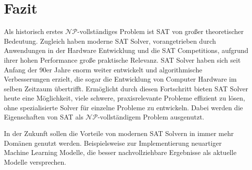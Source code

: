 \documentclass[conference,compsoc,final,a4paper]{IEEEtran}
\begin{document}
\section{Fazit}
Als historisch erstes $\mathcal{NP}$-vollständiges Problem ist SAT von großer theoretischer Bedeutung. Zugleich haben moderne SAT Solver, vorangetrieben durch Anwendungen in der Hardware Entwicklung und die SAT Competitions, aufgrund ihrer hohen Performance große praktische Relevanz. SAT Solver haben sich seit Anfang der 90er Jahre enorm weiter entwickelt und algorithmische Verbesserungen erzielt, die sogar die Entwicklung von Computer Hardware im selben Zeitzaum übertrifft. Ermöglicht durch diesen Fortschritt bieten SAT Solver heute eine Möglichkeit, viele schwere, praxisrelevante Probleme effizient zu lösen, ohne spezialisierte Solver für einzelne Probleme zu entwickeln. Dabei werden die Eigenschaften von SAT als $\mathcal{NP}$-vollständigem Problem ausgenutzt.

In der Zukunft sollen die Vorteile von modernen SAT Solvern in immer mehr Domänen genutzt werden. Beispielsweise zur Implementierung neuartiger Machine Learning Modelle, die besser nachvollziehbare Ergebnisse als aktuelle Modelle versprechen.



\printbibliography
\end{document}
